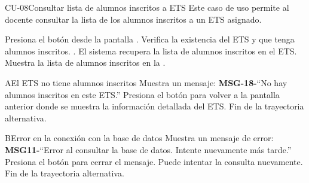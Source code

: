

\begin{UseCase}{CU-08}{Consultar lista de alumnos inscritos a ETS}{
		Este caso de uso permite al docente consultar la lista de los alumnos inscritos a un ETS asignado.
	}
\end{UseCase}
\begin{UCtrayectoria}
	\UCpaso[\UCactor] Presiona el botón  desde la pantalla .
	\UCpaso Verifica la existencia del ETS y que tenga alumnos inscritos. .
	\UCpaso El sistema recupera la lista de alumnos inscritos en el ETS. 
	\UCpaso Muestra la lista de alumnos inscritos en la .
\end{UCtrayectoria}

\begin{UCtrayectoriaA}{A}{El ETS no tiene alumnos inscritos}
	\UCpaso Muestra un mensaje: {\bf MSG-18-}{``No hay alumnos inscritos en este ETS.''}
	\UCpaso[\UCactor] Presiona el botón  para volver a la pantalla anterior donde se muestra la información detallada del ETS.
	\UCpaso Fin de la trayectoria alternativa.
\end{UCtrayectoriaA}
\begin{UCtrayectoriaA}{B}{Error en la conexión con la base de datos}
	\UCpaso Muestra un mensaje de error: {\bf MSG11-}{``Error al consultar la base de datos. Intente nuevamente más tarde.''}
	\UCpaso[\UCactor] Presiona el botón  para cerrar el mensaje.
	\UCpaso[\UCactor] Puede intentar la consulta nuevamente.
	\UCpaso Fin de la trayectoria alternativa.
\end{UCtrayectoriaA}
